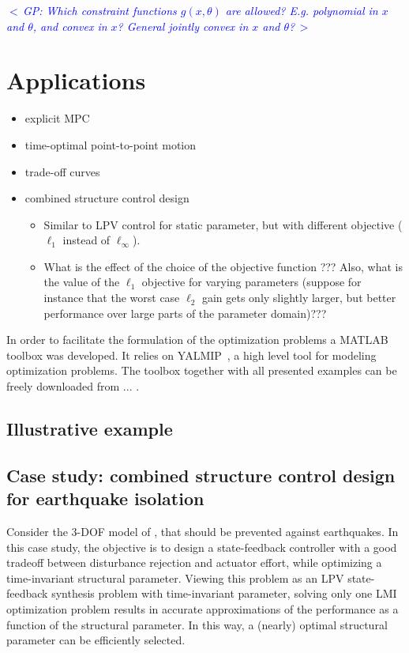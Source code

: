 \documentclass{article}
\newcommand{\commentGP}[1]{\noindent \textcolor{blue}{\emph{$<\,$GP: #1$\,>$}}}%
\newcommand{\ppar}{\theta}                          %
\begin{document}
\commentGP{Which constraint functions $g(x,\ppar)$ are allowed? E.g. polynomial in $x$ and $\ppar$, and convex in $x$? General jointly convex in $x$ and $\ppar$?}


\section{Applications}

\begin{itemize}
\item explicit MPC
\item time-optimal point-to-point motion
\item trade-off curves
\item combined structure control design
    \begin{itemize}
    \item Similar to LPV control for static parameter, but with different objective ($\ell_1$ instead of $\ell_\infty$).
    \item What is the effect of the choice of the objective function ??? Also, what is the value of the $\ell_1$ objective for varying parameters (suppose for instance that the worst case $\ell_2$ gain gets only slightly larger, but better performance over large parts of the parameter domain)???
    \end{itemize}
\end{itemize}

In order to facilitate the formulation of the optimization problems a MATLAB
toolbox was developed. It relies on YALMIP~\cite{YALMIP}, a high level tool for
modeling optimization problems. The toolbox together with all presented examples can
be freely downloaded from ... .

\subsection{Illustrative example}


\subsection{Case study: combined structure control design for earthquake isolation}
Consider the 3-DOF model of \cite{Camino_2003}, that should be prevented against earthquakes. In this case study, the objective is to design a state-feedback controller with a good tradeoff between disturbance rejection and actuator effort, while optimizing a time-invariant structural parameter. Viewing this problem as an LPV state-feedback synthesis problem with time-invariant parameter, solving only one LMI optimization problem results in accurate approximations of the performance as a function of the structural parameter. In this way, a (nearly) optimal structural parameter can be efficiently selected.
\end{document}

